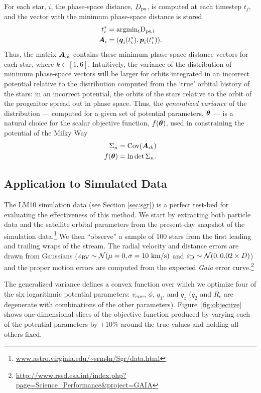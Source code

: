 For each star, $i$,
the phase-space distance, $D_{\rm ps}$, is computed at each timestep
$t_{j}$, and the vector with the minimum phase-space distance is stored
\begin{align}
  t^*_{i} &= \rm argmin_{t} D_{{\rm ps},i}\\
  \boldsymbol{A}_{i} &= (\boldsymbol{q}_{i}(t^*_{i}),\boldsymbol{p}_{i}(t^*_{i})).
\end{align}
Thus, the matrix $\boldsymbol{A}_{ik}$ contains these minimum phase-space
distance vectors for each star, where $k\in[1,6]$. Intuitively, the
variance of the distribution of minimum phase-space vectors will be
larger for orbits integrated in an incorrect potential relative to the
distribution computed from the `true' orbital history of the stars: in
an incorrect potential, the orbits of the stars relative to the orbit of 
the progenitor spread out in phase space. Thus, the \emph{generalized
 variance} of the distribution --- computed for a given set of
potential parameters, $\boldsymbol{\theta}$ --- is a natural choice for the
scalar objective function, $f(\boldsymbol{\theta})$, used in constraining the potential of the
Milky Way
\begin{align}
  \Sigma_n &= \mathrm{Cov}( \boldsymbol{A}_{ik}) \\
  f(\boldsymbol{\theta}) &= \ln \det \Sigma_n.
\end{align}

\subsection{Application to Simulated Data} \label{sec:results}
The LM10 simulation data (see Section \ref{sec:sgr}) is a perfect
test-bed for evaluating the effectiveness of this method. We start by
extracting both particle data and the satellite orbital parameters
from the present-day snapshot of the simulation
data.\footnote{\url{www.astro.virginia.edu/~srm4n/Sgr/data.html}} We
then ``observe'' a sample of 100 stars from the first leading and
trailing wraps of the stream. The radial velocity and distance errors are drawn 
from Gaussians ($\varepsilon_{\rm RV} \sim \mathcal{N}(\mu=0,\sigma=10~{\rm
  km/s})$ and $\varepsilon_{\rm D} \sim \mathcal{N}(0,0.02\times
D)$) and the proper motion errors are computed from the expected {\it Gaia} error curve.\footnote{\url{http://www.rssd.esa.int/index.php?page=Science_Performance&project=GAIA}} 

The generalized variance defines a convex function over
which we optimize four of the six logarithmic potential parameters:
$v_{circ}$, $\phi$, $q_1$, and $q_z$ ($q_2$ and $R_c$
are degenerate with combinations of the other parameters). 
Figure~\ref{fig:objective} shows one-dimensional slices of
the objective function produced by varying each of the potential
parameters by $\pm10\%$ around the true values and holding all others
fixed.

